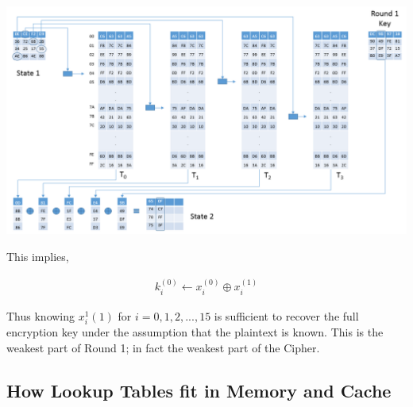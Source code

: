 \documentclass[3p]{elsarticle}
\begin{document}
\begin{center}
\includegraphics[scale=0.4,natwidth=918,natheight=525]{Figures/aes-1-2(new).png}
\label{fig: The diagram shows how $x_4^1,x_5^1,x_6^1,x_7^1$ are computed.}
\end{center}




\begin{flushleft}
This implies,
\end{flushleft}
\begin{align*}
k_i^{(0)} \gets x_i^{(0)} \oplus x_i^{(1)}
\end{align*}

\begin{flushleft}
Thus knowing $x_i^1{(1)}$ for $i=0,1,2,...,15$ is sufficient to recover the full encryption key under the assumption that the plaintext is known. This is the weakest part of Round 1; in fact the weakest part of the Cipher.
\end{flushleft}

\subsection{How Lookup Tables fit in Memory and Cache}
\end{document}
